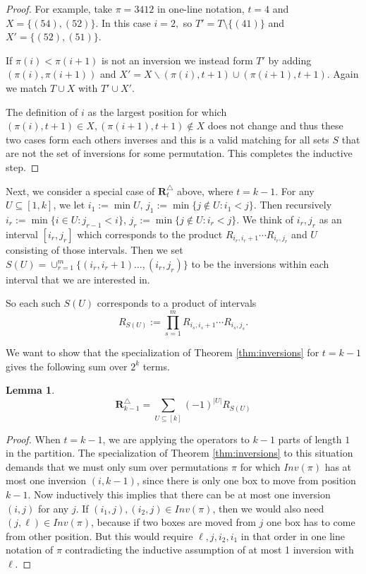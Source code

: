 \documentclass[11pt]{amsart}
\newtheorem{lemma}[theorem]{Lemma}
\begin{document}
\begin{proof}
For example, take $\pi=3412$ in one-line notation, $t=4$ and $X=\{(54),(52)\}$. In this case $i=2,$ so $T'=T \setminus \{(41)\}$ and $X'=\{(52),(51)\}.$

If $\pi(i)< \pi(i+1)$ is not an inversion we instead form $T'$ by adding $(\pi(i),\pi(i+1)) $ and $X'=X\backslash (\pi(i),t+1)\cup (\pi(i+1),t+1)$. Again we match $T\cup X$ with $T' \cup X'$.  

The definition of $i$ as the largest position for which $(\pi(i),t+1)\in X, (\pi(i+1),t+1)\notin X$ does not change and thus these two cases form each others inverses and this is a valid matching for all sets $S$ that are not the set of inversions for some permutation. This completes the inductive step.
\end{proof}



  Next, we consider a special case of $\mathbf{R}_t^{\triangle}$ above, where $t=k-1$. For any $U\subseteq [1,k]$, we let $i_1:=\min U$, $j_1:=\min\{j\notin U:i_1<j\}$.
 Then recursively $i_r:=\min\{i\in U:j_{r-1}<i\}$, $j_r:=\min\{j\notin U:i_r<j\}$.
 We think of $i_r,j_r$ as an interval $[i_r,j_r]$ which corresponds to the product
 $R_{i_r,i_r+1}\cdots R_{i_r,j_r}$ and $U$ consisting of those intervals.
 Then we set $S(U)=\cup_{r=1}^m\{(i_r,i_r+1)\ldots,(i_{r},j_{r})\}$ to be the 
inversions within each interval that we are interested in. 

So each such $S(U)$ corresponds to a product of intervals \[R_{S(U)}:=\prod_{s=1}^m R_{i_s,i_s+1}\cdots R_{i_s,j_s}.\]



 We want to show that the specialization of Theorem \ref{thm:inversions} for $t=k-1$ gives the following sum over $2^k$ terms.
 \begin{lemma} \label{trieqk}
 \begin{equation} \label{algcancel}
 \mathbf{R}^\triangle_{k-1}=\sum_{U\subseteq [k]} (-1)^{|U|} R_{S(U)}
 \end{equation}
 
 \end{lemma}
 
\begin{proof}
When $t=k-1$, we are applying the operators to $k-1$ parts of length $1$ in the partition. The specialization of Theorem \ref{thm:inversions} to this situation demands that we must only sum over permutations $\pi$ for which $Inv(\pi)$ has at most one inversion $(i,k-1)$, since there is only one box to move from position $k-1$. Now inductively this implies that there can be at most one inversion $(i,j)$ for any $j$. If $(i_1,j),(i_2,j)\in Inv(\pi)$, then we would also need $(j,\ell)\in Inv(\pi)$, because if two boxes are moved from $j$ one box has to come from other position. But this would require $\ell,j,i_2,i_1$ in that order in one line notation of $\pi$ contradicting the inductive assumption of at most 1 inversion with $\ell$.
\end{proof}
 
\end{document}
